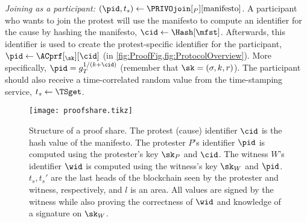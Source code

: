 
\emph{Joining as a participant: \((\pid, t_s)\gets 
    \PRIVOjoin[_P][\text{manifesto}]\).}
A participant who wants to join the protest will use the manifesto to compute an identifier for the cause by hashing the manifesto, \(\cid\gets \Hash[\mfst]\).
Afterwards, this identifier is used to create the protest-specific identifier for the participant, \(\pid\gets \ACprf[_{\sk}][\cid]\) (in 
\cref{fig:ProofFig,fig:ProtocolOverview}).
More specifically, \(\pid = g_T^{1/(k+\cid)}\) (remember that \(\sk = (\sigma, k, r)\)).
The participant should also receive a time-correlated random value from the time-stamping service, \(t_s\gets \TSget\).


\begin{figure}
  \centering
  \texttt{[image: proofshare.tikz]}
  \caption{%
    Structure of a proof share.
    The protest (cause) identifier \(\cid\) is the hash value of the manifesto.
    The protester \(P\)'s identifier \(\pid\) is computed using the protester's key \(\sk_P\) and \(\cid\).
    The witness \(W\)'s identifier \(\wid\) is computed using the witness's key \(\sk_W\) and \(\pid\).
    \(t_s, t_s'\) are the last heads of the blockchain seen by the protester and witness, respectively, and \(l\) is an area.
    All values are signed by the witness while also proving the correctness of \(\wid\) and knowledge of a signature on \(\sk_W\).
  }%
  \label{fig:ProofFig}
\end{figure}%

